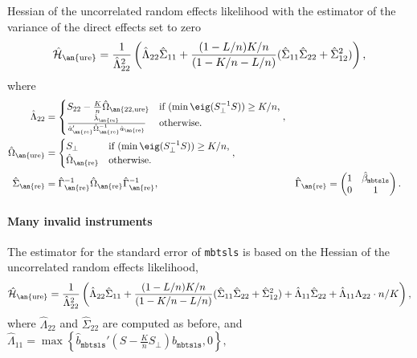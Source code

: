 \documentclass{mynotes}
\newcommand{\h}[2]{\hat{#1}_{\text{\an{#2}}}} %
\begin{document}
    Hessian of the uncorrelated random effects likelihood with the estimator of
    the variance of the direct effects set to zero \citep{kolesar12re}
    \begin{equation*}
      \h{\mathcal{H}}{ure}=
      \frac{1}{\hat{\Lambda}_{22}^{2}}\left(\hat{\Lambda}_{22}\hat{\Sigma}_{11}+
        \frac{(1-L/n )K/n}{(1-K/n-L/n)}
        (\hat{\Sigma}_{11}\hat{\Sigma}_{22}+\hat{\Sigma}_{12}^{2})    \right),
    \end{equation*}
where
\begin{align*}
  \hat{\Lambda}_{22}&= \begin{cases} S_{22}-\frac{K }{n}\h{\Omega}{22,ure} &
    \text{if $(\min\eig(S_{\perp}^{-1}S))\geq K/n$,} \\
    \frac{\h{\lambda}{re}}{\h{a}{re}'\h{\Omega}{re}^{-1}\h{a}{re}} &
    \text{otherwise.}
      \end{cases},\\
      \h{\Omega}{ure}&=\begin{cases}
        S_{\perp} & \text{if $(\min\eig(S_{\perp}^{-1}S))\geq K/n$,} \\
        \h{\Omega}{re} & \text{otherwise.}
      \end{cases},\\
      \h{\Sigma}{re} &= \h{\Gamma}{re}^{-1}\h{\Omega}{re}\h{\Gamma}{re}^{-1}, &
      \h{\Gamma}{re} &=\begin{pmatrix} 1& \hat{\beta}_{\mathtt{mbtsls}}\\
        0 &1
  \end{pmatrix}.
\end{align*}

\paragraph{Many invalid instruments}
The estimator for the standard error of \texttt{mbtsls} is based on the Hessian
of the uncorrelated random effects likelihood,
    \begin{equation*}
      \h{\mathcal{H}}{ure}=
      \frac{1}{\hat{\Lambda}_{22}^{2}}\left(\hat{\Lambda}_{22}\hat{\Sigma}_{11}+
        \frac{(1-L/n )K/n}{(1-K/n-L/n)}
        (\hat{\Sigma}_{11}\hat{\Sigma}_{22}+\hat{\Sigma}_{12}^{2})
        +\hat{\Lambda}_{11}\hat{\Sigma}_{22}+
        \hat{\Lambda}_{11}\Lambda_{22}\cdot n/K
      \right),
    \end{equation*}
    where $\hat{\Lambda}_{22}$ and $\hat{\Sigma}_{22}$ are computed as before,
    and $\hat{\Lambda}_{11}=\max\left\{\hat{b}_{\mathtt{mbtsls}}'(S-\frac{K
        }{n}S_{\perp}) \hat{b}_{\mathtt{mbtsls}} ,0\right\},$
\end{document}
